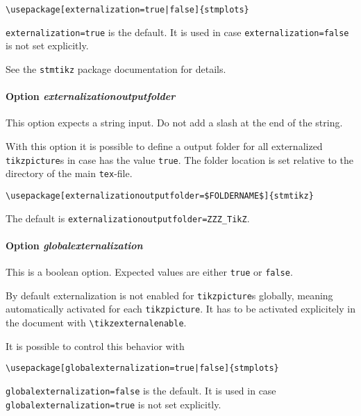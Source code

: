 \documentclass[%
  type=article,%
  layout=koma,%
  date=true,%
  hyperref=true,%
  listings=true,%
  math=true,%
  plots=false,%
]{stmtext}
\begin{document}
\begin{verbatim}
\usepackage[externalization=true|false]{stmplots}
\end{verbatim}

\texttt{externalization=true} is the default. It is used in case \texttt{externalization=false} is not set explicitly.

See the \texttt{stmtikz} package documentation for details.

\paragraph{Option \protect\textit{externalizationoutputfolder}}
\label{sec:usage:preamble:wholepackage:options:outputfolder}

This option expects a string input. Do not add a slash at the end of the string.

With this option it is possible to define a output folder for all externalized \texttt{tikzpicture}s in case  has the value \texttt{true}. The folder location is set relative to the directory of the main \texttt{tex}-file.

\begin{verbatim}
\usepackage[externalizationoutputfolder=$FOLDERNAME$]{stmtikz}
\end{verbatim}

The default is \texttt{externalizationoutputfolder=ZZZ\_TikZ}.

\paragraph{Option \protect\textit{globalexternalization}}
\label{sec:usage:preamble:wholepackage:options:globalexternalization}

This is a boolean option.  Expected values are either \texttt{true} or \texttt{false}. 

By default externalization is not enabled for \texttt{tikzpicture}s globally, meaning automatically activated for each \texttt{tikzpicture}. It has to be activated explicitely in the document with \texttt{\textbackslash tikzexternalenable}.

It is possible to control this behavior with 

\begin{verbatim}
\usepackage[globalexternalization=true|false]{stmplots}
\end{verbatim}

\texttt{globalexternalization=false} is the default. It is used in case \texttt{globalexternalization=true} is not set explicitly.
\end{document}
